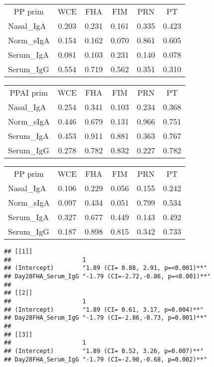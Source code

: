 \documentclass[
]{article}
\begin{document}
\begin{tabular}{>{}l|>{}c|>{}c|>{}c|>{}c|c}
\hline
\multicolumn{1}{c|}{PP prim} & \multicolumn{1}{c|}{WCE} & \multicolumn{1}{c|}{FHA} & \multicolumn{1}{c|}{FIM} & \multicolumn{1}{c|}{PRN} & \multicolumn{1}{c}{PT} \\
\cline{1-1} \cline{2-2} \cline{3-3} \cline{4-4} \cline{5-5} \cline{6-6}
Nasal\_IgA & 0.203 & 0.231 & 0.161 & 0.335 & 0.423\\
\hline
Norm\_sIgA & 0.154 & 0.162 & 0.070 & 0.861 & 0.605\\
\hline
Serum\_IgA & 0.081 & 0.103 & 0.231 & 0.140 & 0.078\\
\hline
Serum\_IgG & 0.554 & 0.719 & 0.562 & 0.351 & 0.310\\
\hline
\end{tabular}

\begin{tabular}{>{}l|>{}c|>{}c|>{}c|>{}c|c}
\hline
\multicolumn{1}{c|}{PPAI prim} & \multicolumn{1}{c|}{WCE} & \multicolumn{1}{c|}{FHA} & \multicolumn{1}{c|}{FIM} & \multicolumn{1}{c|}{PRN} & \multicolumn{1}{c}{PT} \\
\cline{1-1} \cline{2-2} \cline{3-3} \cline{4-4} \cline{5-5} \cline{6-6}
Nasal\_IgA & 0.254 & 0.341 & 0.103 & 0.234 & 0.368\\
\hline
Norm\_sIgA & 0.446 & 0.679 & 0.131 & 0.966 & 0.751\\
\hline
Serum\_IgA & 0.453 & 0.911 & 0.881 & 0.363 & 0.767\\
\hline
Serum\_IgG & 0.278 & 0.782 & 0.832 & 0.227 & 0.782\\
\hline
\end{tabular}

\begin{tabular}{>{}l|>{}c|>{}c|>{}c|>{}c|c}
\hline
\multicolumn{1}{c|}{PP prim} & \multicolumn{1}{c|}{WCE} & \multicolumn{1}{c|}{FHA} & \multicolumn{1}{c|}{FIM} & \multicolumn{1}{c|}{PRN} & \multicolumn{1}{c}{PT} \\
\cline{1-1} \cline{2-2} \cline{3-3} \cline{4-4} \cline{5-5} \cline{6-6}
Nasal\_IgA & 0.106 & 0.229 & 0.056 & 0.155 & 0.242\\
\hline
Norm\_sIgA & 0.097 & 0.434 & 0.051 & 0.799 & 0.534\\
\hline
Serum\_IgA & 0.327 & 0.677 & 0.449 & 0.143 & 0.492\\
\hline
Serum\_IgG & 0.187 & 0.898 & 0.815 & 0.342 & 0.733\\
\hline
\end{tabular}

\begin{verbatim}
## [[1]]
##                    1                                   
## (Intercept)        "1.89 (CI= 0.88, 2.91, p=<0.001)**" 
## Day28FHA_Serum_IgG "-1.79 (CI=-2.72,-0.86, p=<0.001)**"
## 
## [[2]]
##                    1                                  
## (Intercept)        "1.89 (CI= 0.61, 3.17, p=0.004)**" 
## Day28FHA_Serum_IgG "-1.79 (CI=-2.86,-0.73, p=0.001)**"
## 
## [[3]]
##                    1                                  
## (Intercept)        "1.89 (CI= 0.52, 3.26, p=0.007)**" 
## Day28FHA_Serum_IgG "-1.79 (CI=-2.90,-0.68, p=0.002)**"
\end{verbatim}
\end{document}
